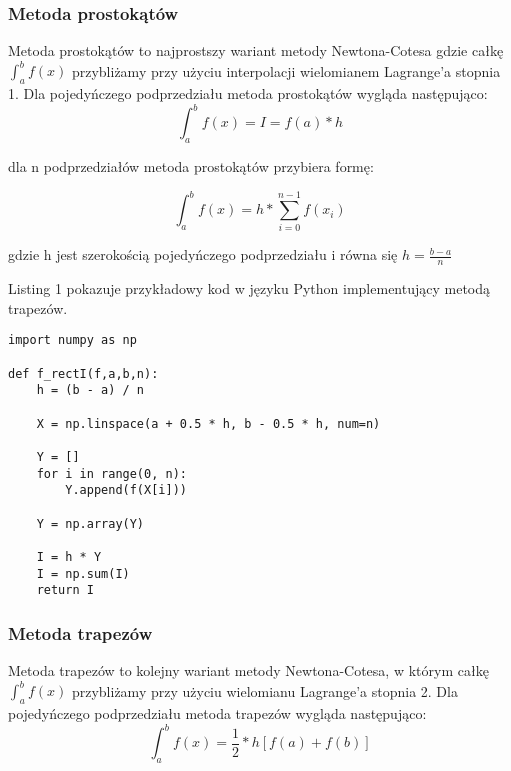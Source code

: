 \documentclass[12pt,twoside]{article}
\begin{document}
\clearpage	

\subsubsection{Metoda prostokątów}

Metoda prostokątów to najprostszy wariant metody Newtona-Cotesa gdzie całkę $\int_a^b f(x)$ przybliżamy przy użyciu interpolacji wielomianem Lagrange'a stopnia 1.
Dla pojedyńczego podprzedziału metoda prostokątów wygląda następująco:
\begin{equation}
\int_a^b f(x) = I = f(a)*h
\label{Eq:rownanie}
\end{equation}

dla n podprzedziałów metoda prostokątów przybiera formę:

\begin{equation}
\int_a^b f(x) = h * \sum_{i=0}^{n-1}f(x_i)
\label{Eq:rownanie}
\end{equation}

gdzie h jest szerokością pojedyńczego podprzedziału i równa się $h = \frac{b-a}{n}$  \cite{rect}

Listing 1 pokazuje przykładowy kod w języku Python implementujący metodą trapezów.
\begin{lstlisting}[caption={Kod w języku python implementujący metodę prostokątów}]
import numpy as np

def f_rectI(f,a,b,n):
    h = (b - a) / n

    X = np.linspace(a + 0.5 * h, b - 0.5 * h, num=n)

    Y = []
    for i in range(0, n):
        Y.append(f(X[i]))

    Y = np.array(Y)

    I = h * Y
    I = np.sum(I)
    return I
\end{lstlisting}
\label{Listing 1}



\subsubsection{Metoda trapezów}
Metoda trapezów to kolejny wariant metody Newtona-Cotesa, w którym całkę $\int_a^b f(x)$ przybliżamy przy użyciu wielomianu Lagrange'a stopnia 2.
Dla pojedyńczego podprzedziału metoda trapezów wygląda następująco:
\begin{equation}
\int_a^b f(x) =  \frac{1}{2}*h[f(a) + f(b)]
\label{Eq:rownanie}
\end{equation}
\end{document}
